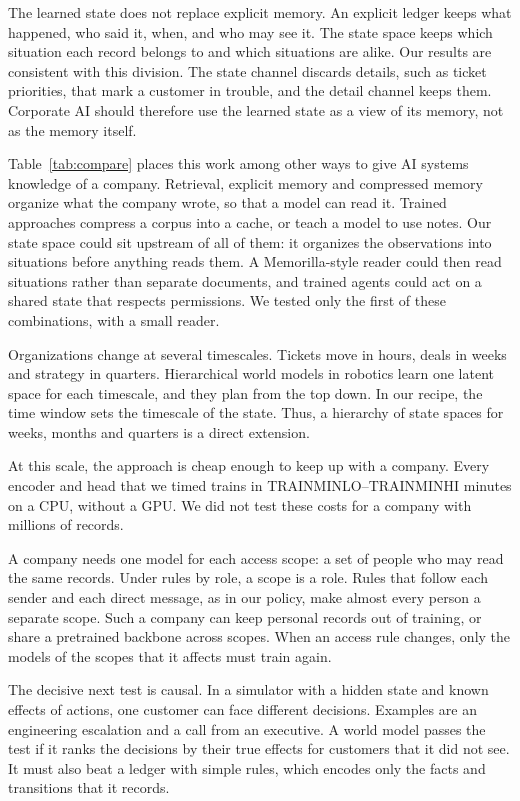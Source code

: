 \documentclass[11pt]{article}
\begin{document}
The learned state does not replace explicit memory. An explicit ledger keeps what happened, who said it, when, and who may see it. The state space keeps which situation each record belongs to and which situations are alike. Our results are consistent with this division. The state channel discards details, such as ticket priorities, that mark a customer in trouble, and the detail channel keeps them. Corporate AI should therefore use the learned state as a view of its memory, not as the memory itself.

Table~\ref{tab:compare} places this work among other ways to give AI systems knowledge of a company. Retrieval, explicit memory and compressed memory organize what the company wrote, so that a model can read it\citep{lewis2020rag,rasmussen2025zep,fallahpour2026memorilla}. Trained approaches compress a corpus into a cache, or teach a model to use notes\citep{eyuboglu2025cartridges,engram2026notes}. Our state space could sit upstream of all of them: it organizes the observations into situations before anything reads them. A Memorilla-style reader could then read situations rather than separate documents, and trained agents could act on a shared state that respects permissions. We tested only the first of these combinations, with a small reader.

Organizations change at several timescales. Tickets move in hours, deals in weeks and strategy in quarters. Hierarchical world models in robotics learn one latent space for each timescale, and they plan from the top down\citep{zhang2026hjepa}. In our recipe, the time window sets the timescale of the state. Thus, a hierarchy of state spaces for weeks, months and quarters is a direct extension.

At this scale, the approach is cheap enough to keep up with a company. Every encoder and head that we timed trains in TRAINMINLO--TRAINMINHI minutes on a CPU, without a GPU. We did not test these costs for a company with millions of records.

A company needs one model for each access scope: a set of people who may read the same records. Under rules by role, a scope is a role. Rules that follow each sender and each direct message, as in our policy, make almost every person a separate scope. Such a company can keep personal records out of training, or share a pretrained backbone across scopes. When an access rule changes, only the models of the scopes that it affects must train again.

The decisive next test is causal. In a simulator with a hidden state and known effects of actions, one customer can face different decisions. Examples are an engineering escalation and a call from an executive. A world model passes the test if it ranks the decisions by their true effects for customers that it did not see. It must also beat a ledger with simple rules, which encodes only the facts and transitions that it records.
\end{document}
